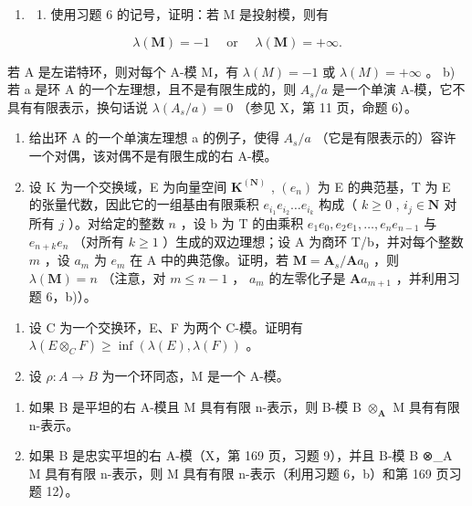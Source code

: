 \begin{enumerate}
\def\labelenumi{\arabic{enumi})}
\setcounter{enumi}{6}
\tightlist
\item
  \begin{enumerate}
  \def\labelenumii{\alph{enumii})}
  \tightlist
  \item
    使用习题 6 的记号，证明：若 M 是投射模，则有
  \end{enumerate}
\end{enumerate}

\[
\lambda (\mathbf {M}) = - 1 \quad \text { or } \quad \lambda (\mathbf {M}) = + \infty .
\]

若 A 是左诺特环，则对每个 A-模 M，有 \(\lambda(M) = -1\) 或 \(\lambda(M) = +\infty\) 。 b) 若 a 是环 A 的一个左理想，且不是有限生成的，则 \(A_s/a\) 是一个单演 A-模，它不具有有限表示，换句话说 \(\lambda(A_s/a) = 0\) （参见 X，第 11 页，命题 6）。

\begin{enumerate}
\def\labelenumi{\alph{enumi})}
\setcounter{enumi}{2}
\item
  给出环 A 的一个单演左理想 a 的例子，使得 \(A_{s}/a\) （它是有限表示的）容许一个对偶，该对偶不是有限生成的右 A-模。
\item
  设 K 为一个交换域，E 为向量空间 \(\mathbf{K}^{(\mathbf{N})}\) , \((e_n)\) 为 E 的典范基，T 为 E 的张量代数，因此它的一组基由有限乘积 \(e_{i_1} e_{i_2} \ldots e_{i_k}\) 构成（ \(k \geqslant 0\) , \(i_j \in \mathbf{N}\) 对所有 \(j\) ）。对给定的整数 \(n\) ，设 b 为 T 的由乘积 \(e_1 e_0, e_2 e_1, \ldots, e_n e_{n-1}\) 与 \(e_{n+k} e_n\) （对所有 \(k \geqslant 1\) ）生成的双边理想；设 A 为商环 T/b，并对每个整数 \(m\) ，设 \(a_{m}\) 为 \(e_{m}\) 在 A 中的典范像。证明，若 \(\mathbf{M} = \mathbf{A}_{s}/\mathbf{A}a_{0}\) ，则 \(\lambda(\mathbf{M}) = n\) （注意，对 \(m \leqslant n - 1\) ， \(a_{m}\) 的左零化子是 \(\mathbf{A}a_{m+1}\) ，并利用习题 6，b)）。
\end{enumerate}

\begin{enumerate}
\def\labelenumi{\arabic{enumi})}
\setcounter{enumi}{7}
\tightlist
\item
  设 C 为一个交换环，E、F 为两个 C-模。证明有 \(\lambda(E \otimes_{C} F) \geqslant \inf(\lambda(E), \lambda(F))\) 。
\item
  设 \(\rho: A \to B\) 为一个环同态，M 是一个 A-模。
\end{enumerate}

\begin{enumerate}
\def\labelenumi{\alph{enumi})}
\item
  如果 B 是平坦的右 A-模且 M 具有有限 n-表示，则 B-模 B \(\otimes_{\mathbf{A}}\) M 具有有限 n-表示。
\item
  如果 B 是忠实平坦的右 A-模（X，第 169 页，习题 9），并且 B-模 B ⊗\_A M 具有有限 n-表示，则 M 具有有限 n-表示（利用习题 6，b）和第 169 页习题 12）。
\end{enumerate}

